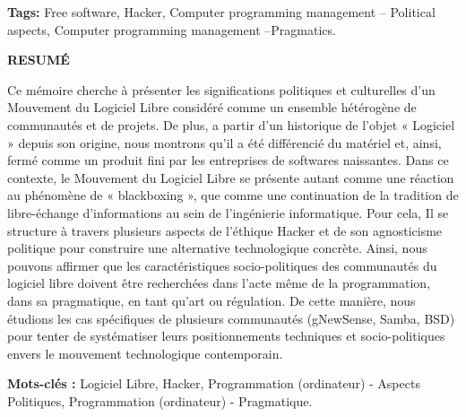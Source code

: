 \textbf{Tags:} Free software, Hacker, Computer programming management –   Political aspects, Computer programming management –Pragmatics.

\newpage

\begin{center} \textbf{RESUMÉ} \end{center}

\vspace*{.5cm}

Ce mémoire cherche à présenter les significations politiques et culturelles d’un Mouvement du Logiciel Libre considéré comme un ensemble hétérogène de communautés et de projets. De plus, a partir d’un historique de l’objet « Logiciel » depuis son origine, nous montrons qu’il a été différencié du matériel et, ainsi, fermé comme un produit fini par les entreprises de softwares naissantes. Dans ce contexte, le Mouvement du Logiciel Libre se présente autant comme une réaction au phénomène de « blackboxing », que comme une continuation de la tradition de libre-échange d’informations au sein de l'ingénierie informatique. Pour cela, Il se structure à travers plusieurs aspects de l'éthique Hacker et de son agnosticisme politique pour construire une alternative technologique concrète. Ainsi, nous pouvons affirmer que les caractéristiques socio-politiques des communautés du logiciel libre doivent être recherchées dans l’acte même de la programmation, dans sa pragmatique, en tant qu’art ou régulation. De cette manière, nous étudions les cas spécifiques de plusieurs communautés (gNewSense, Samba, BSD) pour tenter de systématiser leurs positionnements techniques et socio-politiques envers le mouvement technologique contemporain.

\textbf{Mots-clés :} Logiciel Libre, Hacker, Programmation (ordinateur) - Aspects Politiques, Programmation (ordinateur) - Pragmatique.

\newpage




